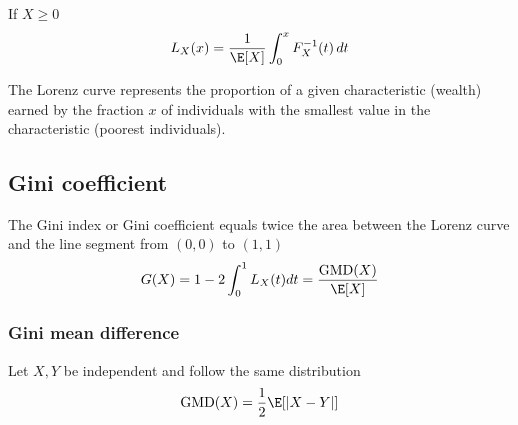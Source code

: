 If $X\geq 0$ 
\begin{equation*}
    L_X(x) = \dfrac{1}{\E[X]}\int_0^x F^{-1}_X(t)\,dt
\end{equation*}

The Lorenz curve represents the proportion of a given characteristic (wealth) 
earned by the fraction $x$ of individuals with the smallest value in the 
characteristic (poorest individuals). 


\subsection{Gini coefficient} %
\label{sub:gini_coefficient}

The Gini index or Gini coefficient equals twice the area between the Lorenz curve
and the line segment from $(0,0)$ to $(1,1)$
\begin{equation*}
    G(X) = 1-2\int_0^1L_X(t)dt = \dfrac{\text{GMD}(X)}{\E[X]}
\end{equation*}

\subsubsection{Gini mean difference}
Let $X,Y$ be independent and follow the same distribution
\begin{equation}
    \text{GMD}(X) = \dfrac{1}{2}\E[|X-Y|]
\end{equation}
